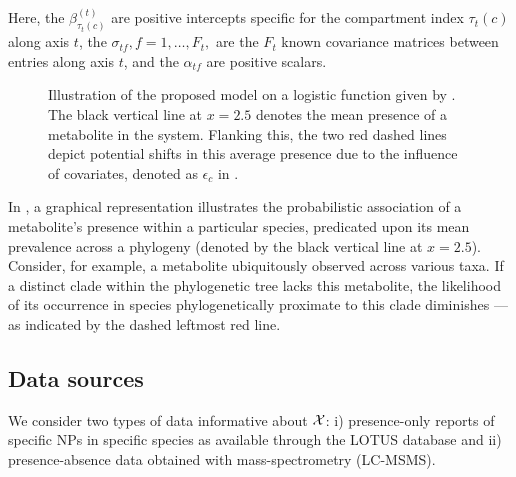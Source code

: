 \documentclass[
11pt, %
oneside, %
english, %
singlespacing, %
headsepline, %
chapterinoneline, %
]{MastersDoctoralThesis} %
\def\X{{\cal X}}
\begin{document}
Here, the $\beta^{(t)}_{\tau_t(c)}$ are positive intercepts specific for the compartment index $\tau_t(c)$ along axis $t$, the $\sigma_{tf}, f=1, \ldots, F_t,$ are the $F_t$ known covariance matrices between entries along axis $t$, and the $\alpha_{tf}$ are positive scalars.

\begin{figure}[h]
	\centering
	\caption{Illustration of the proposed model on a logistic function given by . The black vertical line at $x=2.5$ denotes the mean presence of a metabolite in the system. Flanking this, the two red dashed lines depict potential shifts in this average presence due to the influence of covariates, denoted as $\epsilon_c$ in .}
	\label{fig: example sigmoid function}
\end{figure}

In , a graphical representation illustrates the probabilistic association of a metabolite's presence within a particular species, predicated upon its mean prevalence across a phylogeny (denoted by the black vertical line at $x=2.5$). Consider, for example, a metabolite ubiquitously observed across various taxa. If a distinct clade within the phylogenetic tree lacks this metabolite, the likelihood of its occurrence in species phylogenetically proximate to this clade diminishes — as indicated by the dashed leftmost red line.

	\subsection{Data sources}\label{subsec: data sources}
	We consider two types of data informative about $\X$: i) presence-only reports of specific NPs in specific species as available through the LOTUS database and ii) presence-absence data obtained with mass-spectrometry (LC-MSMS).
	
\end{document}
